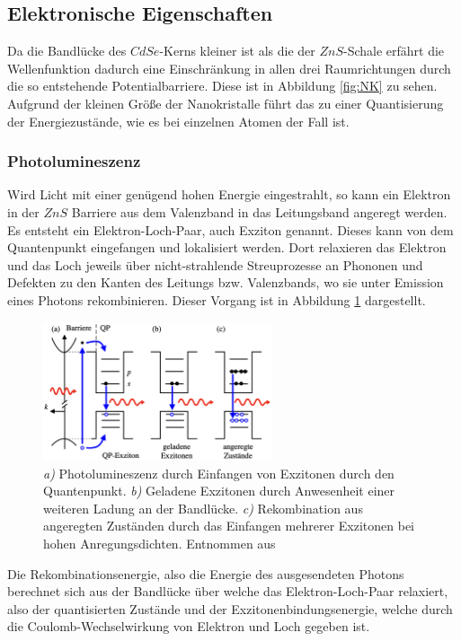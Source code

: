   \subsection{Elektronische Eigenschaften}
    Da die Bandlücke des $CdSe$-Kerns kleiner ist als die der $ZnS$-Schale erfährt die Wellenfunktion dadurch eine Einschränkung in allen drei Raumrichtungen durch die so entstehende Potentialbarriere. Diese ist in Abbildung \ref{fig:NK} zu sehen.
    Aufgrund der kleinen Größe der Nanokristalle führt das zu einer Quantisierung der Energiezustände, wie es bei einzelnen Atomen der Fall ist.
    \subsubsection{Photolumineszenz}
      Wird Licht mit einer genügend hohen Energie eingestrahlt, so kann ein Elektron in der $ZnS$ Barriere aus dem Valenzband in das Leitungsband angeregt werden. Es entsteht ein Elektron-Loch-Paar, auch Exziton genannt. Dieses kann von dem Quantenpunkt eingefangen und lokalisiert werden. Dort relaxieren das Elektron und das Loch jeweils über nicht-strahlende Streuprozesse an Phononen und Defekten zu den Kanten des Leitungs bzw. Valenzbands, wo sie unter Emission eines Photons rekombinieren.
      Dieser Vorgang ist in Abbildung \ref{fig:Prozess} dargestellt.
      \begin{figure}[h]
        \centering
        \includegraphics[width = 0.6\textwidth]{pictures/Prozess.png}
        \caption{\textit{a)} Photolumineszenz durch Einfangen von Exzitonen durch den Quantenpunkt. \textit{b)} Geladene Exzitonen durch Anwesenheit einer weiteren Ladung an der Bandlücke. \textit{c)} Rekombination aus angeregten Zuständen durch das Einfangen mehrerer Exzitonen bei hohen Anregungsdichten. Entnommen aus \cite{tu_dortmund_versuchsanleitung_2021-6}}
        \label{fig:Prozess}
      \end{figure}
      Die Rekombinationsenergie, also die Energie des ausgesendeten Photons berechnet sich aus der Bandlücke über welche das Elektron-Loch-Paar relaxiert, also der quantisierten Zustände und der Exzitonenbindungsenergie, welche durch die Coulomb-Wechselwirkung von Elektron und Loch gegeben ist.
